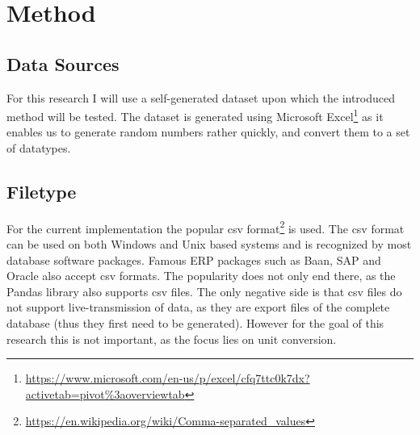 \documentclass[sigchi, nonacm]{acmart}
\begin{document}
\section{Method}




\subsection{Data Sources}
For this research I will use a self-generated dataset upon which the introduced method will be tested. The dataset is generated using Microsoft Excel\footnote{\raggedright{\url{https://www.microsoft.com/en-us/p/excel/cfq7ttc0k7dx?activetab=pivot\%3aoverviewtab}}} as it enables us to generate random numbers rather quickly, and convert them to a set of datatypes.


\subsection{Filetype}
For the current implementation the popular csv format\footnote{\raggedright{\url{https://en.wikipedia.org/wiki/Comma-separated_values}}} is used. The csv format can be used on both Windows and Unix based systems and is recognized by most database software packages. Famous ERP packages such as Baan, SAP and Oracle also accept csv formats. The popularity does not only end there, as the Pandas library also supports csv files. 
The only negative side is that csv files do not support live-transmission of data, as they are export files of the complete database (thus they first need to be generated). However for the goal of this research this is not important, as the focus lies on unit conversion.
\end{document}
